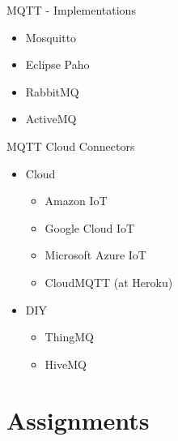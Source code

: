 \begin{frame}{MQTT - Implementations}
\protect\hypertarget{mqtt---implementations}{}

\begin{itemize}
\tightlist
\item
  Mosquitto
\item
  Eclipse Paho
\item
  RabbitMQ
\item
  ActiveMQ
\end{itemize}


\end{frame}

\begin{frame}{MQTT Cloud Connectors}
\protect\hypertarget{mqtt-cloud-connectors}{}

\begin{itemize}
\tightlist
\item
  Cloud

  \begin{itemize}
  \tightlist
  \item
    Amazon IoT
  \item
    Google Cloud IoT
  \item
    Microsoft Azure IoT
  \item
    CloudMQTT (at Heroku)
  \end{itemize}
\item
  DIY

  \begin{itemize}
  \tightlist
  \item
    ThingMQ
  \item
    HiveMQ
  \end{itemize}
\end{itemize}


\end{frame}

\hypertarget{assignments}{%
\section{Assignments}\label{assignments}}

